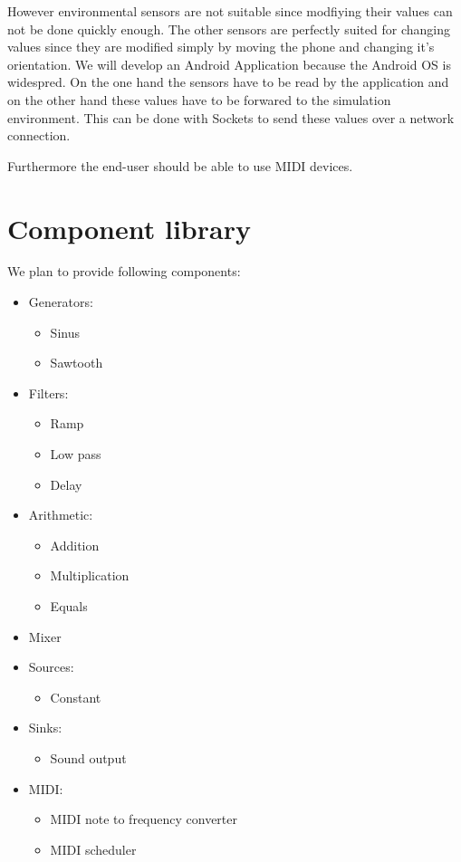 However environmental sensors are not suitable since modfiying their values can not be done quickly enough. The other sensors are perfectly suited for changing values since they are modified simply by moving the phone and changing it's orientation. We will develop an Android Application because the Android OS is widespred. On the one hand the sensors have to be read by the application and on the other hand these values have to be forwared to the simulation environment. This can be done with Sockets to send these values over a network connection.

Furthermore the end-user should be able to use MIDI devices.

\section{Component library}
We plan to provide following components:

\begin{itemize}
\item Generators:
\begin{itemize}
\item Sinus
\item Sawtooth
\end{itemize}

\item Filters:
\begin{itemize}
\item Ramp
\item Low pass
\item Delay
\end{itemize}

\item Arithmetic:
\begin{itemize}
\item Addition 
\item Multiplication
\item Equals
\end{itemize}

\item Mixer

\item Sources:
\begin{itemize}
\item Constant
\end{itemize}

\item Sinks:
\begin{itemize}
\item Sound output
\end{itemize}

\item MIDI: 
\begin{itemize}
\item MIDI note to frequency converter
\item MIDI scheduler
\end{itemize}

\end{itemize}